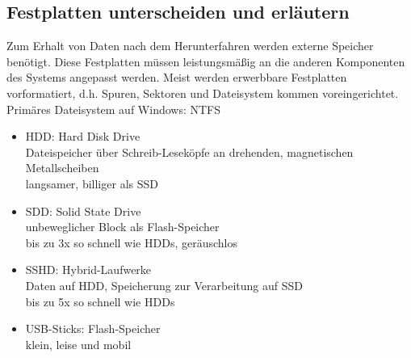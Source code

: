 \subsection{Festplatten unterscheiden und erläutern}
    \begin{subindent}
        Zum Erhalt von Daten nach dem Herunterfahren werden externe Speicher benötigt. Diese Festplatten müssen leistungsmäßig an die anderen Komponenten des Systems angepasst werden.
        Meist werden erwerbbare Festplatten vorformatiert, d.h. Spuren, Sektoren und Dateisystem kommen voreingerichtet. Primäres Dateisystem auf Windows: NTFS
    \end{subindent}

    \begin{tcolorbox}[width=15cm, center, title=Arten von Festplatten, coltitle=white, colframe=orange, colback=white!60!orange]
        \begin{itemize}[itemsep=0.1em, parsep=0.3em]
            \item HDD\@: Hard Disk Drive \\ Dateispeicher über Schreib-Leseköpfe an drehenden, magnetischen Metallscheiben \\ langsamer, billiger als SSD
            \item SDD\@: Solid State Drive \\ unbeweglicher Block als Flash-Speicher \\ bis zu 3x so schnell wie HDDs, geräuschlos
            \item SSHD\@: Hybrid-Laufwerke \\ Daten auf HDD, Speicherung zur Verarbeitung auf SSD \\ bis zu 5x so schnell wie HDDs
            \item USB-Sticks\@: Flash-Speicher \\ klein, leise und mobil
        \end{itemize}
    \end{tcolorbox}

